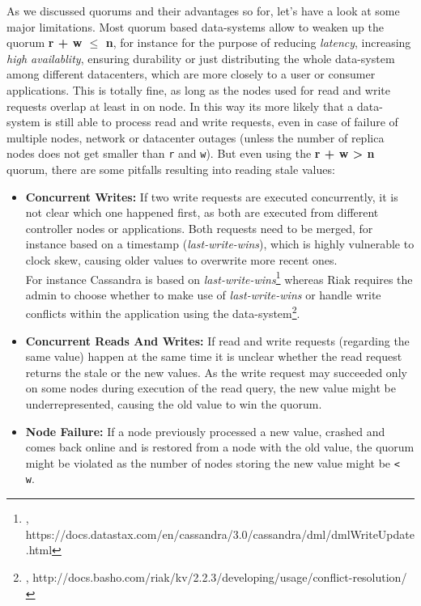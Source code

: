 {
As we discussed quorums and their advantages so for, let's have a look at some major limitations. Most quorum based data-systems allow to weaken up the quorum \textbf{r + w $\leq$ n}, for instance for the purpose of reducing \textit{latency}, increasing \textit{high availablity}, ensuring durability or just distributing the whole data-system among different datacenters, which are more closely to a user or consumer applications. This is totally fine, as long as the nodes used for read and write requests overlap at least in on node. In this way its more likely that a data-system is still able to process read and write requests, even in case of failure of multiple nodes, network or datacenter outages (unless the number of replica nodes does not get smaller than \lstinline{r} and \lstinline{w}). 
But even using the \textbf{r + w > n} quorum, there are some pitfalls resulting into reading stale values:\\
\begin{itemize}
\item \textbf{Concurrent Writes:} If two write requests are executed concurrently, it is not clear which one happened first, as both are executed from different controller nodes or applications. Both requests need to be merged, for instance based on a timestamp (\textit{last-write-wins}), which is highly vulnerable to clock skew, causing older values to overwrite more recent ones.\\
For instance Cassandra is based on \textit{last-write-wins}\footnote{\cite{CASLWW}, https://docs.datastax.com/en/cassandra/3.0/cassandra/dml/dmlWriteUpdate.html} whereas Riak requires the admin to choose whether to make use of \textit{last-write-wins} or handle write conflicts within the application using the data-system\footnote{\cite{RIALWW}, http://docs.basho.com/riak/kv/2.2.3/developing/usage/conflict-resolution/}.
\item \textbf{Concurrent Reads And Writes:} If read and write requests (regarding the same value) happen at the same time it is unclear whether the read request returns the stale or the new values. As the write request may succeeded only on some nodes during execution of the read query, the new value might be underrepresented, causing the old value to win the quorum.
\item \textbf{Node Failure:} If a node previously processed a new value, crashed and comes back online and is restored from a node with the old value, the quorum might be violated as the number of nodes storing the new value might be \lstinline{< w}.

\end{itemize}}
